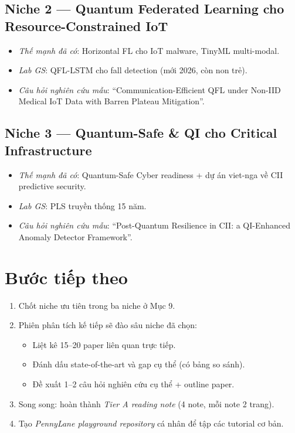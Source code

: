 \documentclass[11pt,a4paper]{article}
\begin{document}
\subsection{Niche 2 --- Quantum Federated Learning cho Resource-Constrained IoT}
\begin{itemize}
  \item \textit{Thế mạnh đã có}: Horizontal FL cho IoT malware, TinyML multi-modal.
  \item \textit{Lab GS}: QFL-LSTM cho fall detection (mới 2026, còn non trẻ).
  \item \textit{Câu hỏi nghiên cứu mẫu}: ``Communication-Efficient QFL under Non-IID Medical IoT Data with Barren Plateau Mitigation''.
\end{itemize}

\subsection{Niche 3 --- Quantum-Safe \& QI cho Critical Infrastructure}
\begin{itemize}
  \item \textit{Thế mạnh đã có}: Quantum-Safe Cyber readiness + dự án viet-nga về CII predictive security.
  \item \textit{Lab GS}: PLS truyền thống 15 năm.
  \item \textit{Câu hỏi nghiên cứu mẫu}: ``Post-Quantum Resilience in CII: a QI-Enhanced Anomaly Detector Framework''.
\end{itemize}

\section{Bước tiếp theo}

\begin{enumerate}
  \item Chốt niche ưu tiên trong ba niche ở Mục 9.
  \item Phiên phân tích kế tiếp sẽ đào sâu niche đã chọn:
    \begin{itemize}
      \item Liệt kê 15--20 paper liên quan trực tiếp.
      \item Đánh dấu state-of-the-art và gap cụ thể (có bảng so sánh).
      \item Đề xuất 1--2 câu hỏi nghiên cứu cụ thể + outline paper.
    \end{itemize}
  \item Song song: hoàn thành \textit{Tier A reading note} (4 note, mỗi note 2 trang).
  \item Tạo \textit{PennyLane playground repository} cá nhân để tập các tutorial cơ bản.
\end{enumerate}
\end{document}
